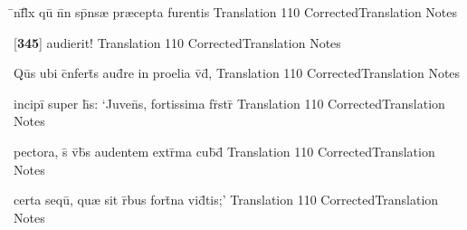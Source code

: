 \latline
  {\={\macron {\i}}nf\={}l\={\macron {\i}}x qu\={\macron {\i}} n\={}n sp\={}ns{\ae} pr{\ae}cepta furentis}
  { Translation }
  {110}
  { CorrectedTranslation }
  { Notes }


\latline
  {[\textbf{345}] audierit!}
  { Translation }
  {110}
  { CorrectedTranslation }
  { Notes }


\latline
  {Qu\={}s ubi c\={}nfert\={}s aud\={}re in proelia v\={\macron {\i}}d\={\macron {\i}},}
  { Translation }
  {110}
  { CorrectedTranslation }
  { Notes }


\latline
  {incipi\={} super h\={\macron {\i}}s: `Juven\={}s, fortissima fr\={}str\={}}
  { Translation }
  {110}
  { CorrectedTranslation }
  { Notes }


\latline
  {pectora, s\={\macron {\i}} v\={}b\={\macron {\i}}s audentem extr\={}ma cub\={\macron {\i}}d\={}}
  { Translation }
  {110}
  { CorrectedTranslation }
  { Notes }


\latline
  {certa sequ\={\macron {\i}}, qu{\ae} sit r\={}bus fort\={}na vid\={}tis;'}
  { Translation }
  {110}
  { CorrectedTranslation }
  { Notes }


